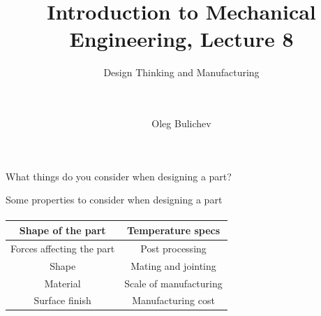 \documentclass[aspectratio=169]{beamer}
\title[IME]{Introduction to Mechanical Engineering, Lecture 8} %
\subtitle{Design Thinking and Manufacturing  
\\ \   \\   
\ } %
\author{Oleg Bulichev}
\newcommand{\fbckg}[1]{\usebackgroundtemplate{\texttt{[image: \#1]}}}%
\begin{document}
\setlength{\abovedisplayskip}{0pt}
\setlength{\belowdisplayskip}{0pt}
\setlength{\abovedisplayshortskip}{0pt}
\setlength{\belowdisplayshortskip}{0pt}

\fbckg{fibeamer/figs/title_page.png}

\fbckg{fibeamer/figs/common.png}

\note{\scriptsize \begin{itemize}
        \item \
    \end{itemize}}

\begin{frame}[c]{}
    \framesubtitle{}
        \LARGE \centering
        What things do you consider when designing a part?
    \end{frame}

\begin{frame}[c]{Some properties to consider when designing a part}
\framesubtitle{}
\begin{table}[H]
    \LARGE
    \centering
    \begin{tabular}{|c|c|}
    \hline
        \textbf{Shape of the part} & \textbf{Temperature specs} \\ \hline
        Forces affecting the part & Post processing \\ 
        Shape & Mating and jointing \\ 
        Material & Scale of manufacturing \\ 
        Surface finish & Manufacturing cost \\ \hline
    \end{tabular}
\end{table}
\end{frame}
\end{document}
